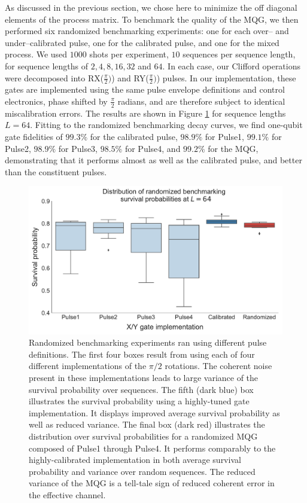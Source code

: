 \documentclass[aps,nofootinbib,pra,notitlepage,twocolumn]{revtex4-1}
\begin{document}
As discussed in the previous section, we chose here to minimize the off diagonal elements of the process matrix. To benchmark the quality of the MQG, we then performed six randomized benchmarking experiments\cite{Magesan2011}: one for each over-- and under--calibrated pulse, one for the calibrated pulse, and one for the mixed process. We used $1000$ shots per experiment, $10$ sequences per sequence length, for sequence lengths of $2, 4, 8, 16, 32$ and $64$. In each case, our Clifford operations were decomposed into RX($\frac{\pi}{2})$) and RY($\frac{\pi}{2})$) pulses. In our implementation, these gates are implemented using the same pulse envelope definitions and control electronics, phase shifted by $\frac{\pi}{2}$ radians, and are therefore subject to identical miscalibration errors. The results are shown in Figure \ref{fig:rb} for sequence lengths $L=64$. Fitting to the randomized benchmarking decay curves, we find one-qubit gate fidelities of $99.3\%$ for the calibrated pulse, $98.9\%$ for Pulse1, $99.1\%$ for Pulse2, $98.9\%$ for Pulse3, $98.5\%$ for Pulse4, and $99.2\%$ for the MQG, demonstrating that it performs almost as well as the calibrated pulse, and better than the constituent pulses. 
\begin{figure}[t]
  \centering
  \includegraphics[width=\columnwidth]{rb_data.pdf}
  \caption{Randomized benchmarking experiments ran using different pulse definitions. The first four boxes result from using each of four different implementations of the ${\pi/2}$ rotations. The coherent noise present in these implementations leads to large variance of the survival probability over sequences. The fifth (dark blue) box illustrates the survival probability using a highly-tuned gate implementation. It displays improved average survival probability as well as reduced variance. The final box (dark red) illustrates the distribution over survival probabilities for a randomized MQG composed of Pulse1 through Pulse4. It performs comparably to the highly-calibrated implementation in both average survival probability and variance over random sequences. The reduced variance of the MQG is a tell-tale sign of reduced coherent error in the effective channel. }
  \label{fig:rb}
\end{figure}
\end{document}
